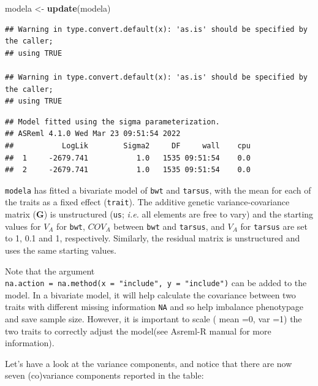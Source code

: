 \documentclass[
  12pt,
]{book}
\newenvironment{Shaded}{\begin{snugshade}}{\end{snugshade}}
\newcommand{\KeywordTok}[1]{\textcolor[rgb]{0.13,0.29,0.53}{\textbf{#1}}}
\newcommand{\NormalTok}[1]{#1}
\newcommand{\OperatorTok}[1]{\textcolor[rgb]{0.81,0.36,0.00}{\textbf{#1}}}
\newcommand{\StringTok}[1]{\textcolor[rgb]{0.31,0.60,0.02}{#1}}
\begin{document}
\begin{Shaded}
\begin{Highlighting}[]
\NormalTok{modela \textless{}{-}}\StringTok{ }\KeywordTok{update}\NormalTok{(modela)}
\end{Highlighting}
\end{Shaded}

\begin{verbatim}
## Warning in type.convert.default(x): 'as.is' should be specified by the caller;
## using TRUE

## Warning in type.convert.default(x): 'as.is' should be specified by the caller;
## using TRUE
\end{verbatim}

\begin{verbatim}
## Model fitted using the sigma parameterization.
## ASReml 4.1.0 Wed Mar 23 09:51:54 2022
##           LogLik        Sigma2     DF     wall    cpu
##  1     -2679.741           1.0   1535 09:51:54    0.0
##  2     -2679.741           1.0   1535 09:51:54    0.0
\end{verbatim}

\texttt{modela} has fitted a bivariate model of \texttt{bwt} and \texttt{tarsus}, with the mean for each of the traits as a fixed effect (\texttt{trait}). The additive genetic variance-covariance matrix (\(\textbf{G}\)) is unstructured (\texttt{us}; \emph{i.e.} all elements are free to vary) and the starting values for \(V_A\) for \texttt{bwt}, \(COV_A\) between \texttt{bwt} and \texttt{tarsus}, and \(V_A\) for \texttt{tarsus} are set to 1, 0.1 and 1, respectively. Similarly, the residual matrix is unstructured and uses the same starting values.

Note that the argument \texttt{na.action\ =\ na.method(x\ =\ "include",\ y\ =\ "include")} can be added to the model. In a bivariate model, it will help calculate the covariance between two traits with different missing information \texttt{NA} and so help imbalance phenotypage and save sample size. However, it is important to scale ( mean =0, var =1) the two traits to correctly adjust the model(see Asreml-R manual for more information).

Let's have a look at the variance components, and notice that there are now seven (co)variance components reported in the table:

\begin{Shaded}
\end{Shaded}
\end{document}
